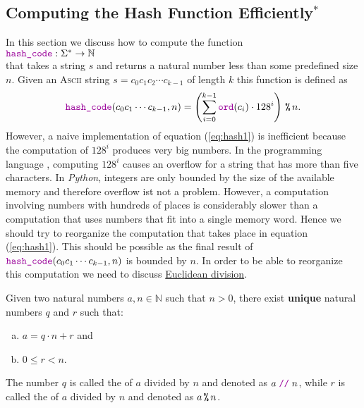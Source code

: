 \subsection{Computing the Hash Function Efficiently$^*$}
In this section we discuss how to compute the function 
\\[0.2cm]
\hspace*{1.3cm}
$\mytt{hash\_code}:\Sigma^* \rightarrow \mathbb{N}$
\\[0.2cm]
that takes a string $s$ and returns a natural number less than some predefined size $n$.
Given an \textsc{Ascii} string $s = c_0 c_1 c_2 \cdots c_{k-1}$ of length $k$ this function is defined as
\begin{equation}
  \mytt{hash\_code}(c_0c_1\cdots c_{k-1}, n) = \left(\sum\limits_{i=0}^{k-1} \mytt{ord}(c_i) \cdot 128^i\right) \mmod n.
  \label{eq:hash1}
\end{equation}
However, a naive implementation of equation (\ref{eq:hash1}) is inefficient because the computation of $128^i$
produces very big numbers.  In the programming language , computing $128^i$ causes an overflow for a
string that has more than five characters.  In \textsl{Python}, integers are only bounded by the size of the
available memory and therefore overflow ist not a problem.  However, a computation
involving numbers with hundreds of places is considerably slower than a computation that uses numbers that fit
into a single memory word. Hence we should try to reorganize the computation that takes place in equation
(\ref{eq:hash1}).  This should be possible as the final result of $\mytt{hash\_code}(c_0c_1\cdots c_{k-1}, n)$
is bounded by $n$.  In order to be able to reorganize this computation we need to discuss
\href{https://en.wikipedia.org/wiki/Euclidean_division}{Euclidean division}.

\begin{Theorem}
  Given two natural numbers $a, n \in \mathbb{N}$ such that $n > 0$, there exist \textbf{unique} natural numbers 
  $q$ and $r$ such that:
  \begin{enumerate}[(a)]
  \item $a = q \cdot n + r$ \quad and
  \item $0 \leq r < n$.
  \end{enumerate}
  The number $q$ is called the  of $a$ divided by $n$ and denoted as $a \;\mytt{//}\; n$, while
  $r$ is called the  of $a$ divided by $n$ and denoted as $a \,\texttt{\%}\, n$.  \eox
\end{Theorem}

